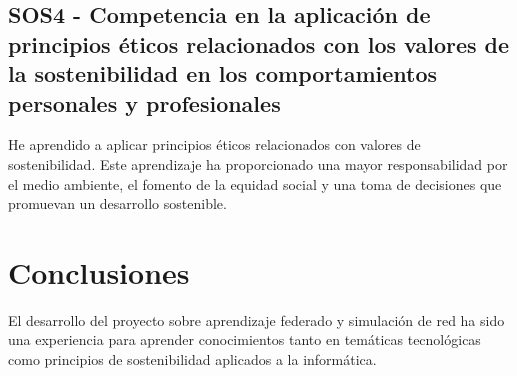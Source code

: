 \subsection{SOS4 - Competencia en la aplicación de principios éticos relacionados con los valores de la sostenibilidad en los comportamientos personales y profesionales}
\label{subsec:SOS4}
He aprendido a aplicar principios éticos relacionados con valores de sostenibilidad. Este aprendizaje ha proporcionado una mayor responsabilidad por el medio ambiente, el fomento de la equidad social y una toma de decisiones que promuevan un desarrollo sostenible.

\section{Conclusiones}
\label{sec:Conclusiones}
El desarrollo del proyecto sobre aprendizaje federado y simulación de red ha sido una experiencia para aprender conocimientos tanto en temáticas tecnológicas como principios de sostenibilidad aplicados a la informática.

